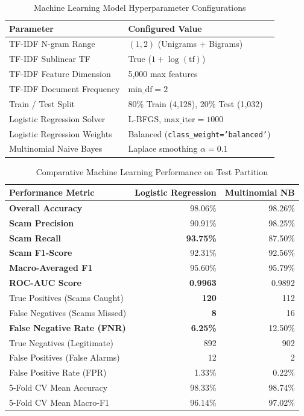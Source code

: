 \documentclass[conference]{IEEEtran}
\providecommand{\toprule}{\hline\hline}
\providecommand{\midrule}{\hline}
\providecommand{\bottomrule}{\hline\hline}
\begin{document}
\begin{table}[h]
\caption{Machine Learning Model Hyperparameter Configurations}
\label{tab:ml_config}
\centering
\small
\begin{tabular}{ll}
\toprule
\textbf{Parameter} & \textbf{Configured Value} \\
\midrule
TF-IDF N-gram Range & $(1, 2)$ (Unigrams + Bigrams) \\
TF-IDF Sublinear TF & True ($1 + \log(\text{tf})$) \\
TF-IDF Feature Dimension & 5,000 max features \\
TF-IDF Document Frequency & $\text{min\_df} = 2$ \\
Train / Test Split & 80\% Train (4,128), 20\% Test (1,032) \\
Logistic Regression Solver & L-BFGS, $\text{max\_iter} = 1000$ \\
Logistic Regression Weights & Balanced (\texttt{class\_weight='balanced'}) \\
Multinomial Naive Bayes & Laplace smoothing $\alpha = 0.1$ \\
\bottomrule
\end{tabular}
\end{table}

\begin{table}[h]
\caption{Comparative Machine Learning Performance on Test Partition}
\label{tab:model_perf}
\centering
\small
\begin{tabular}{lrr}
\toprule
\textbf{Performance Metric} & \textbf{Logistic Regression} & \textbf{Multinomial NB} \\
\midrule
\textbf{Overall Accuracy} & 98.06\% & 98.26\% \\
\textbf{Scam Precision} & 90.91\% & 98.25\% \\
\textbf{Scam Recall} & \textbf{93.75\%} & 87.50\% \\
\textbf{Scam F1-Score} & 92.31\% & 92.56\% \\
\textbf{Macro-Averaged F1} & 95.60\% & 95.79\% \\
\textbf{ROC-AUC Score} & \textbf{0.9963} & 0.9892 \\
True Positives (Scams Caught) & \textbf{120} & 112 \\
False Negatives (Scams Missed) & \textbf{8} & 16 \\
\textbf{False Negative Rate (FNR)} & \textbf{6.25\%} & 12.50\% \\
True Negatives (Legitimate) & 892 & 902 \\
False Positives (False Alarms) & 12 & 2 \\
False Positive Rate (FPR) & 1.33\% & 0.22\% \\
5-Fold CV Mean Accuracy & 98.33\% & 98.74\% \\
5-Fold CV Mean Macro-F1 & 96.14\% & 97.02\% \\
\bottomrule
\end{tabular}
\end{table}
\end{document}
